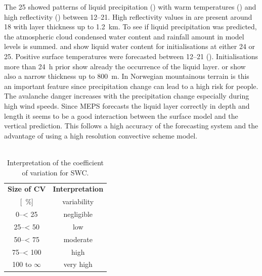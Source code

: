 The \SI{25}{\dec} showed patterns of liquid precipitation () with warm temperatures () and high reflectivity () between \SIrange{12}{21}{\UTC}. High reflectivity values in  are present around \SI{18}{\UTC} with layer thickness up to \SI{1.2}{\km}. 
To see if liquid precipitation was predicted, the atmospheric cloud condensed water content and rainfall amount in model levels is summed.  and  show liquid water content for initialisations at either \SI{24}{\dec} or \SI{25}{\dec}. 
Positive surface temperatures were forecasted between \SIrange{12}{21}{\UTC} (). Initialisations more than \SI{24}{\hour} prior show already the occurrence of the liquid layer.  or  show also a narrow thickness up to \SI{800}{\metre}. 
In Norwegian mountainous terrain is this an important feature since precipitation change can lead to a high risk for people. The avalanche danger increases with the precipitation change especially during high wind speeds. Since MEPS forecasts the liquid layer correctly in depth and length it seems to be a good interaction between the surface model and the vertical prediction. 
This follows a high accuracy of the forecasting system and the advantage of using a high resolution convective scheme model.
\\
\\
\begin{table}[t!]
	\begin{center}
		\caption{Interpretation of the coefficient of variation for SWC.} \label{tab:verification}
		\begin{tabular}{lc|c}
			\hline\hline
			\multicolumn{2}{c|}{\textbf{Size of CV}} & {\textbf{Interpretation}} \\ 
			\multicolumn{2}{c|}{[\SI{}{\percent}]} & variability \\ \hline \hline 
			\multicolumn{2}{c|}{\numrange{0}{< 25}} & negligible  \\ \hline
			\multicolumn{2}{c|}{\numrange{25}{< 50}} & low \\ \hline
			\multicolumn{2}{c|}{\numrange{50}{< 75}} & moderate \\ \hline
			\multicolumn{2}{c|}{\numrange{75}{< 100}} & high \\ \hline
			\multicolumn{2}{c|}{\num{100} to $\infty$} & very high  \\ \hline \hline
		\end{tabular}
	\end{center}
\end{table}
